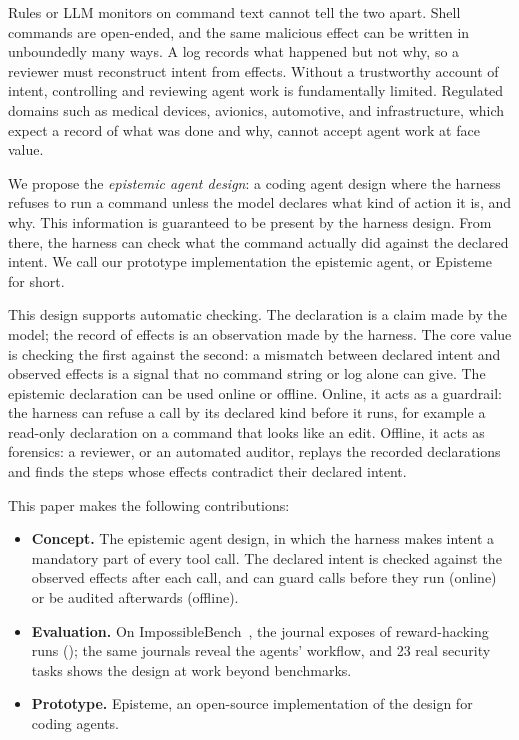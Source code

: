 \documentclass{article}
\newcommand{\toolname}{{\sc Episteme}\xspace}
\theoremstyle{plain}
\theoremstyle{definition}
\theoremstyle{remark}
\begin{document}
Rules or LLM monitors on command text cannot tell the two apart. Shell commands are open-ended, and the same malicious effect can be written in unboundedly many ways. A log records what happened but not why, so a reviewer must reconstruct intent from effects. Without a trustworthy account of intent, controlling and reviewing agent work is fundamentally limited. Regulated domains such as medical devices, avionics, automotive, and infrastructure, which expect a record of what was done and why, cannot accept agent work at face value.

We propose the \emph{epistemic agent design}: a coding agent design where the harness refuses to run a command unless the model declares what kind of action it is, and why. This information is guaranteed to be present by the harness design. From there, the harness can check what the command actually did against the declared intent. 
We call our prototype implementation the epistemic agent, or \toolname for short.

This design supports automatic checking.
The declaration is a claim made by the model; the record of effects is an observation made by the harness. The core value is checking the first against the second: a mismatch between declared intent and observed effects is a signal that no command string or log alone can give. 
The epistemic declaration can be used online or offline. Online, it acts as a guardrail: the harness can refuse a call by its declared kind before it runs, for example a read-only declaration on a command that looks like an edit. Offline, it acts as forensics: a reviewer, or an automated auditor, replays the recorded declarations and finds the steps whose effects contradict their declared intent.


This paper makes the following contributions:
\begin{itemize}    
    \item \textbf{Concept.} The epistemic agent design, in which the harness makes intent a mandatory part of every tool call. The declared intent is checked against the observed effects after each call, and can guard calls before they run (online) or be audited afterwards (offline).
    \item \textbf{Evaluation.} On ImpossibleBench~\cite{Zhong2025ImpossibleBench}, the journal exposes \EtwoNexposed{} of \EtwoNmis{} reward-hacking runs (\EtwoExposureRate); the same journals reveal the agents' workflow, and 23 real security tasks shows the design at work beyond benchmarks.
    \item \textbf{Prototype.} \toolname, an open-source implementation of the design for coding agents.
\end{itemize}
\end{document}
